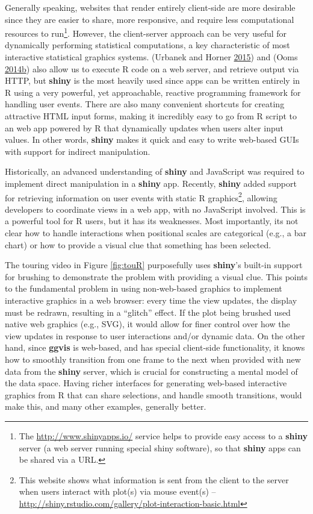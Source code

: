 \documentclass[12pt,]{isuthesis}
\let\rmarkdownfootnote\footnote%
\def\footnote{\protect\rmarkdownfootnote}
\begin{document}
Generally speaking, websites that render entirely client-side are more
desirable since they are easier to share, more responsive, and require
less computational resources to run\footnote{The
  \url{http://www.shinyapps.io/} service helps to provide easy access to
  a \textbf{shiny} server (a web server running special shiny software),
  so that \textbf{shiny} apps can be shared via a URL.}. However, the
client-server approach can be very useful for dynamically performing
statistical computations, a key characteristic of most interactive
statistical graphics systems. (Urbanek and Horner
\protect\hyperlink{ref-FastRWeb}{2015}) and (Ooms
\protect\hyperlink{ref-opencpu}{2014}\protect\hyperlink{ref-opencpu}{b})
also allow us to execute R code on a web server, and retrieve output via
HTTP, but \textbf{shiny} is the most heavily used since apps can be
written entirely in R using a very powerful, yet approachable, reactive
programming framework for handling user events. There are also many
convenient shortcuts for creating attractive HTML input forms, making it
incredibly easy to go from R script to an web app powered by R that
dynamically updates when users alter input values. In other words,
\textbf{shiny} makes it quick and easy to write web-based GUIs with
support for indirect manipulation.

Historically, an advanced understanding of \textbf{shiny} and JavaScript
was required to implement direct manipulation in a \textbf{shiny} app.
Recently, \textbf{shiny} added support for retrieving information on
user events with static R graphics\footnote{This website shows what
  information is sent from the client to the server when users interact
  with plot(s) via mouse event(s) --
  \url{http://shiny.rstudio.com/gallery/plot-interaction-basic.html}},
allowing developers to coordinate views in a web app, with no JavaScript
involved. This is a powerful tool for R users, but it has its
weaknesses. Most importantly, its not clear how to handle interactions
when positional scales are categorical (e.g., a bar chart) or how to
provide a visual clue that something has been selected.

The touring video in Figure \ref{fig:touR} purposefully uses
\textbf{shiny}'s built-in support for brushing to demonstrate the
problem with providing a visual clue. This points to the fundamental
problem in using non-web-based graphics to implement interactive
graphics in a web browser: every time the view updates, the display must
be redrawn, resulting in a ``glitch'' effect. If the plot being brushed
used native web graphics (e.g., SVG), it would allow for finer control
over how the view updates in response to user interactions and/or
dynamic data. On the other hand, since \textbf{ggvis} is web-based, and
has special client-side functionality, it knows how to smoothly
transition from one frame to the next when provided with new data from
the \textbf{shiny} server, which is crucial for constructing a mental
model of the data space. Having richer interfaces for generating
web-based interactive graphics from R that can share selections, and
handle smooth transitions, would make this, and many other examples,
generally better.
\end{document}
